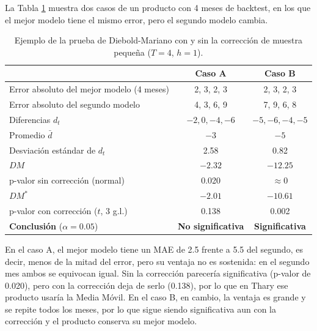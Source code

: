 La Tabla \ref{tab:ejemplo_dm} muestra dos casos de un producto con 4 meses de backtest, en los que el mejor modelo tiene el mismo error, pero el segundo modelo cambia.

\begin{table}[H]
    \centering
    \caption{Ejemplo de la prueba de Diebold-Mariano con y sin la corrección de muestra pequeña ($T = 4$, $h = 1$).}
    \label{tab:ejemplo_dm}
    \renewcommand{\arraystretch}{1.3}
    \begin{tabularx}{\textwidth}{|X|c|c|}
    \hline
    & \textbf{Caso A} & \textbf{Caso B} \\
    \hline
    Error absoluto del mejor modelo (4 meses) & 2, 3, 2, 3 & 2, 3, 2, 3 \\
    \hline
    Error absoluto del segundo modelo & 4, 3, 6, 9 & 7, 9, 6, 8 \\
    \hline
    Diferencias $d_t$ & $-2, 0, -4, -6$ & $-5, -6, -4, -5$ \\
    \hline
    Promedio $\bar{d}$ & $-3$ & $-5$ \\
    \hline
    Desviación estándar de $d_t$ & 2.58 & 0.82 \\
    \hline
    $DM$ & $-2.32$ & $-12.25$ \\
    \hline
    p-valor sin corrección (normal) & 0.020 & $\approx 0$ \\
    \hline
    $DM^{*}$ & $-2.01$ & $-10.61$ \\
    \hline
    p-valor con corrección ($t$, 3 g.l.) & 0.138 & 0.002 \\
    \hline
    \textbf{Conclusión} ($\alpha = 0.05$) & \textbf{No significativa} & \textbf{Significativa} \\
    \hline
    \end{tabularx}
\end{table}

En el caso A, el mejor modelo tiene un MAE de 2.5 frente a 5.5 del segundo, es decir, menos de la mitad del error, pero su ventaja no es sostenida: en el segundo mes ambos se equivocan igual. Sin la corrección parecería significativa (p-valor de 0.020), pero con la corrección deja de serlo (0.138), por lo que en Thary ese producto usaría la Media Móvil. En el caso B, en cambio, la ventaja es grande y se repite todos los meses, por lo que sigue siendo significativa aun con la corrección y el producto conserva su mejor modelo.